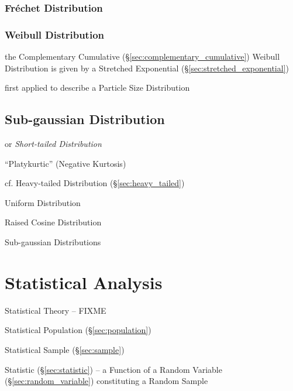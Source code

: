 \subsubsection{Fr\'echet Distribution}\label{sec:frechet_distribution}

\subsubsection{Weibull Distribution}\label{sec:weibull_distribution}

the Complementary Cumulative (\S\ref{sec:complementary_cumulative}) Weibull
Distribution is given by a Stretched Exponential
(\S\ref{sec:stretched_exponential})

first applied to describe a Particle Size Distribution



\subsection{Sub-gaussian Distribution}\label{sec:sub_gaussian}

or \emph{Short-tailed Distribution}

``Platykurtic'' (Negative Kurtosis)

cf. Heavy-tailed Distribution (\S\ref{sec:heavy_tailed})

Uniform Distribution

Raised Cosine Distribution

Sub-gaussian Distributions



\section{Statistical Analysis}\label{sec:statistical_analysis}

Statistical Theory -- FIXME

Statistical Population (\S\ref{sec:population})

Statistical Sample (\S\ref{sec:sample})

Statistic (\S\ref{sec:statistic}) -- a Function of a Random Variable
(\S\ref{sec:random_variable}) constituting a Random Sample

